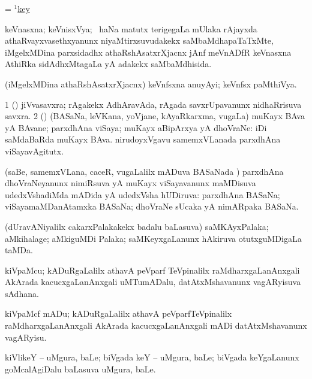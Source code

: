 \bentry
{}
\gl{\nA}
\bmng
= \hyperlink{key(1)7}{$^1$key} 
\emng
\eentry

\bentry
{}
\gl{\gu}
\bmng
keVnasxna; keVnisxVya; \kanmu\ haNa matutx terigegaLa mUlaka rAjayxda athaRvayxvasethxyanunx niyaMtirxsuvudakekx saMbaMdhapaTaTxMte, iMgelxMDina parxsidadhx athaRshAsatxrXjacnx jAnf meVnADfR keVnasxna  AthiRka sidAdhxMtagaLa yA adakekx saMbaMdhisida. 
\emng
\eentry

\bentry
{}
\gl{\nA}
\bmng
(iMgelxMDina athaRshAsatxrXjacnx) keVnfsxna anuyAyi; keVnfsx paMthiVya. 
\emng
\eentry

\bentry
{}
\gl{\nA}
\bmng
\bnum
\num{1} (\saM) jiVvasavxra; rAgakekx AdhAravAda, rAgada savxrUpavanunx nidhaRrisuva savxra. 
\num{2} (\rUpa) (BASaNa, leVKana, yoVjane, kAyaRkarxma, \mo vugaLa) muKayx BAva yA BAvane; parxdhAna viSaya; muKayx aBipArxya yA dhoVraNe:  iDi saMdaBaRda muKayx BAva.  nirudoyxVgavu samemxVLanada parxdhAna viSayavAgitutx. 
\enum
\emng
\eentry

\bentry
{}
\gl{\gu}
\bmng
(saBe, samemxVLana, caceR, \mo vugaLalilx mADuva BASaNada \vi) parxdhAna dhoVraNeyanunx nimiRsuva yA muKayx viSayavanunx maMDisuva udedxVshadiMda mADida yA udedxVsha hUDiruva:   parxdhAna BASaNa; viSayamaMDanAtamxka BASaNa; dhoVraNe sUcaka yA nimARpaka BASaNa. 
\emng
\eentry

\bentry
{}
\gl{\nA}
\bmng
(dUravANiyalilx cakarxPalakakekx badalu baLasuva) saMKAyxPalaka; aMkihalage; aMkiguMDi Palaka; saMKeyxgaLanunx hAkiruva otutxguMDigaLa taMDa. 
\emng
\eentry

\bentry
{}
\gl{\nA}
\bmng
kiVpaMcu; kADuRgaLalilx athavA peVparf TeVpinalilx raMdharxgaLanAnxgali  AkArada kacucxgaLanAnxgali uMTumADalu, datAtxMshavanunx vagARyisuva sAdhana. 
\emng
\eentry

\bentry
{}
\gl{\sakirx}
\bmng
kiVpaMcf mADu; kADuRgaLalilx athavA peVparfTeVpinalilx raMdharxgaLanAnxgali  AkArada kacucxgaLanAnxgali mADi datAtxMshavanunx vagARyisu. 
\emng
\eentry

\bentry
{}
\gl{\nA}
\bmng
kiVlikeY -- uMgura, baLe; biVgada keY -- uMgura, baLe; biVgada keYgaLanunx goMcalAgiDalu baLasuva uMgura, baLe. 
\emng
\eentry

